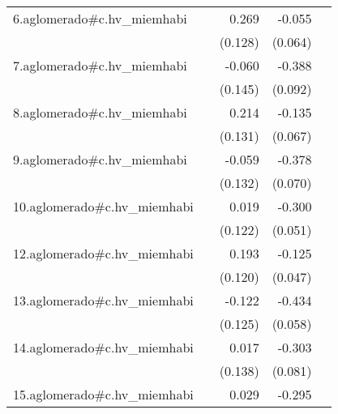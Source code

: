 {\begin{longtable}{l*{4}{D{.}{.}{-1}}}
\addlinespace
6.aglomerado#c.hv\_miemhabi&                     &       0.269\sym{*}  &      -0.055         &                     \\
            &                     &     (0.128)         &     (0.064)         &                     \\
\addlinespace
7.aglomerado#c.hv\_miemhabi&                     &      -0.060         &      -0.388\sym{***}&                     \\
            &                     &     (0.145)         &     (0.092)         &                     \\
\addlinespace
8.aglomerado#c.hv\_miemhabi&                     &       0.214         &      -0.135\sym{*}  &                     \\
            &                     &     (0.131)         &     (0.067)         &                     \\
\addlinespace
9.aglomerado#c.hv\_miemhabi&                     &      -0.059         &      -0.378\sym{***}&                     \\
            &                     &     (0.132)         &     (0.070)         &                     \\
\addlinespace
10.aglomerado#c.hv\_miemhabi&                     &       0.019         &      -0.300\sym{***}&                     \\
            &                     &     (0.122)         &     (0.051)         &                     \\
\addlinespace
12.aglomerado#c.hv\_miemhabi&                     &       0.193         &      -0.125\sym{**} &                     \\
            &                     &     (0.120)         &     (0.047)         &                     \\
\addlinespace
13.aglomerado#c.hv\_miemhabi&                     &      -0.122         &      -0.434\sym{***}&                     \\
            &                     &     (0.125)         &     (0.058)         &                     \\
\addlinespace
14.aglomerado#c.hv\_miemhabi&                     &       0.017         &      -0.303\sym{***}&                     \\
            &                     &     (0.138)         &     (0.081)         &                     \\
\addlinespace
15.aglomerado#c.hv\_miemhabi&                     &       0.029         &      -0.295\sym{***}&                     \\

\end{longtable}}
